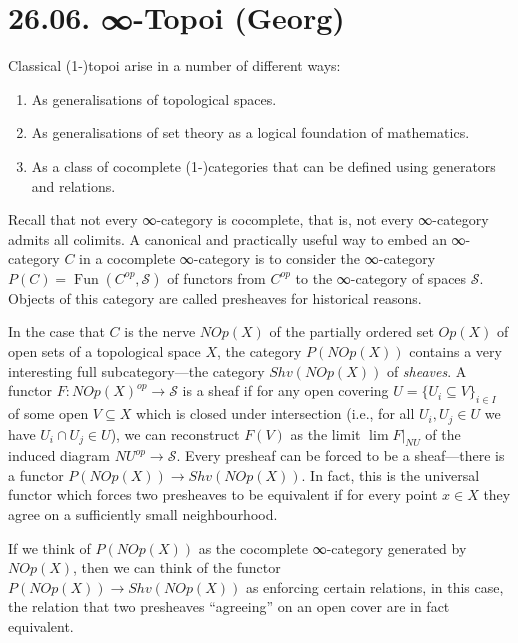 \documentclass[a4paper]{amsart}
\numberwithin{figure}{section}
\theoremstyle{theorem}
\theoremstyle{definition}
\newcommand{\Spaces}{{\mathcal{S}}}
\newcommand{\PreShv}{{{P}}}
\newcommand{\Shv}{{{Shv}}}
\newcommand{\Op}{{{Op}}}
\DeclareMathOperator{\Fun}{Fun}
\begin{document}
\section{26.06. ∞-Topoi (Georg)} \label{topoi}

Classical (1-)topoi arise in a number of different ways:
\begin{enumerate}
 \item As generalisations of topological spaces.
 \item As generalisations of set theory as a logical foundation of mathematics.
 \item As a class of cocomplete (1-)categories that can be defined using generators and relations.
\end{enumerate}


Recall that not every ∞-category is cocomplete, that is, not every ∞-category admits all colimits. A canonical and practically useful way to embed an ∞-category $C$ in a cocomplete ∞-category is to consider the ∞-category $\PreShv(C) = \Fun(C^{op}, \Spaces)$ of functors from $C^{op}$ to the ∞-category of spaces $\Spaces$. Objects of this category are called presheaves for historical reasons. %

In the case that $C$ is the nerve $N\Op(X)$ of the partially ordered set $\Op(X)$ of open sets of a topological space $X$, the category $\PreShv(N\Op(X))$ contains a very interesting full subcategory---the category $\Shv(N\Op(X))$ of \emph{sheaves}. A functor $F: N\Op(X)^{op} \to \Spaces$ is a sheaf if for any open covering ${U} = \{U_i \subseteq V\}_{i \in I}$ of some open $V \subseteq X$ which is closed under intersection (i.e., for all $U_i, U_j \in {U}$ we have $U_i \cap U_j \in {U}$), we can reconstruct $F(V)$ as the limit $\lim F|_{N {U}}$ of the induced diagram $N{U}^{op} → \Spaces$. Every presheaf can be forced to be a sheaf---there is a functor $\PreShv(N\Op(X)) → \Shv(N\Op(X))$. In fact, this is the universal functor which forces two presheaves to be equivalent if for every point $x \in X$ they agree on a sufficiently small neighbourhood. 

If we think of $\PreShv(N\Op(X))$ as the cocomplete ∞-category generated by $N\Op(X)$, then we can think of the functor $\PreShv(N\Op(X)) → \Shv(N\Op(X))$ as enforcing certain relations, in this case, the relation that two presheaves ``agreeing'' on an open cover are in fact equivalent.
\end{document}
